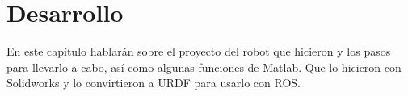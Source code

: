 \chapter{Desarrollo} \label{chap:desarrollo}
En este capítulo hablarán sobre el proyecto del robot que hicieron y los pasos para llevarlo a cabo, así como algunas funciones de Matlab. Que lo hicieron con Solidworks y lo convirtieron a URDF para usarlo con ROS.